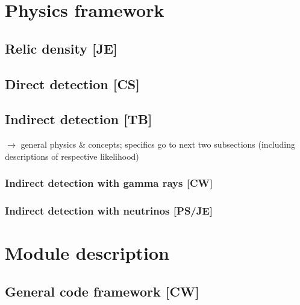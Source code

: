 \section{Physics framework}
\label{phys}


\subsection{Relic density {\bf [JE]}}
\label{phys_rd}

\subsection{Direct detection {\bf [CS]}}
\label{phys_dd}

\subsection{Indirect detection {\bf [TB]}}
\label{phys_id}

$\to$ general physics \& concepts; specifics go to next two subsections 
(including descriptions of respective likelihood)

\subsubsection{Indirect detection with gamma rays {\bf [CW]}}
\label{phys_ga}


\subsubsection{Indirect detection with neutrinos {\bf [PS/JE]}}
\label{phys_nu}




\section{Module description}
\label{code}


\subsection{General code framework {\bf [CW]}}
\label{code_gen}

